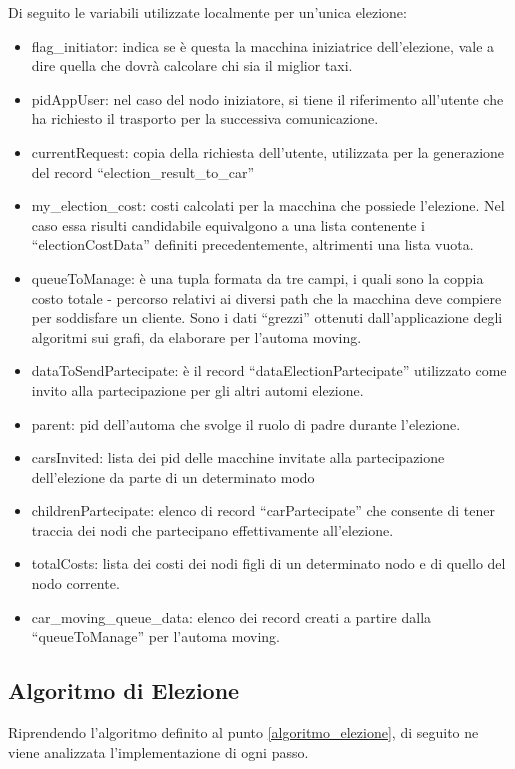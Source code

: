 Di seguito le variabili utilizzate localmente per un'unica elezione:
\begin{itemize}
	\item flag\_initiator: indica se è questa la macchina iniziatrice dell'elezione, vale a dire quella che dovrà calcolare chi sia il miglior taxi.
	\item pidAppUser: nel caso del nodo iniziatore, si tiene il riferimento all'utente che ha richiesto il trasporto per la successiva comunicazione.
	\item currentRequest: copia della richiesta dell'utente, utilizzata per la generazione del record ``election\_result\_to\_car''
	\item my\_election\_cost: costi calcolati per la macchina che possiede l'elezione. Nel caso essa risulti candidabile equivalgono a una lista contenente i ``electionCostData'' definiti precedentemente, altrimenti una lista vuota.
	\item queueToManage: è una tupla formata da tre campi, i quali sono la coppia costo totale - percorso relativi ai diversi path che la macchina deve compiere per soddisfare un cliente. Sono i dati ``grezzi'' ottenuti dall'applicazione degli algoritmi sui grafi, da elaborare per l'automa moving.
	\item dataToSendPartecipate: è il record ``dataElectionPartecipate'' utilizzato come invito alla partecipazione per gli altri automi elezione.
	\item parent: pid dell'automa che svolge il ruolo di padre durante l'elezione. 
	\item carsInvited: lista dei pid delle macchine invitate alla partecipazione dell'elezione da parte di un determinato modo
	\item childrenPartecipate: elenco di record ``carPartecipate'' che consente di tener traccia dei nodi che partecipano effettivamente all'elezione.
	\item totalCosts: lista dei costi dei nodi figli di un determinato nodo e di quello del nodo corrente.
	\item car\_moving\_queue\_data: elenco dei record creati a partire dalla ``queueToManage'' per l'automa moving.
\end{itemize}

\subsection{Algoritmo di Elezione}
Riprendendo l'algoritmo definito al punto \ref{algoritmo_elezione}, di seguito ne viene analizzata l'implementazione di ogni passo.

